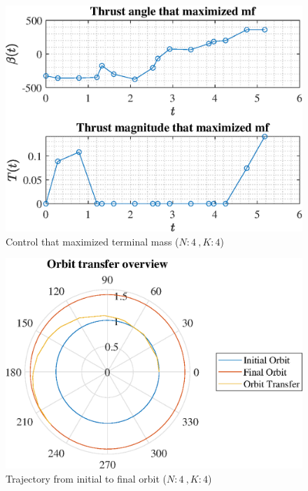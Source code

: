 \documentclass[]{article}
\begin{document}
	\begin{figure}
		\centering
		\includegraphics[scale=0.75]{control_N4_K4_C2_mf.eps}
		\caption{Control that maximized terminal mass (\(N:4\ , K:4\))}
		\label{fig:control_N4_K4_C2_mf}
	\end{figure}
	\begin{figure}
		\centering
		\includegraphics[scale=0.75]{orbit_N4_K4_C2_mf.eps}
		\caption{Trajectory from initial to final orbit (\(N:4\ , K:4\))}
		\label{fig:orbit_N4_K4_C2_mf}
	\end{figure}
\end{document}
